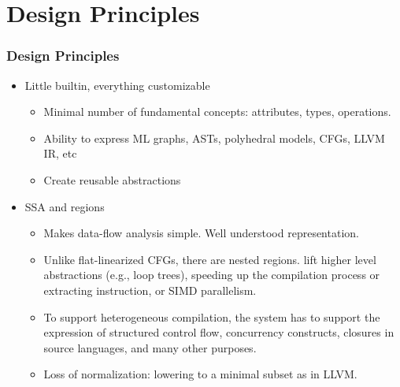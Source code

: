 \documentclass{beamer}
\begin{document}
\section{Design Principles}
\begin{frame}
  \footnotesize
  \frametitle{Design Principles}
  \begin{itemize}
    \itemsep0.5em
    \item Little builtin, everything customizable
      \begin{itemize}
        \footnotesize
        \itemsep0.5em
        \item Minimal number of fundamental concepts: attributes, types, operations.
        \item Ability to express ML graphs, ASTs, polyhedral models, CFGs, LLVM IR, etc
        \item Create reusable abstractions
      \end{itemize}
    \item SSA and regions
      \begin{itemize}
        \footnotesize
        \itemsep0.5em
        \item Makes data-flow analysis simple. Well understood representation.
        \item Unlike flat-linearized CFGs, there are nested regions. lift higher level abstractions (e.g., loop trees),
        speeding up the compilation process or extracting instruction, or SIMD parallelism. 
        \item To support heterogeneous compilation, the system has to support the expression of structured control
        flow, concurrency constructs, closures in source languages, and many other purposes.
        \item Loss of normalization: lowering to a minimal subset as in LLVM. 
      \end{itemize}
  \end{itemize}
\end{frame}
\end{document}
